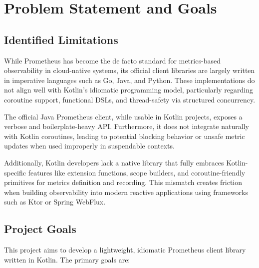 \chapter{Problem Statement and Goals} \label{ch:problemdescription}

\section{Identified Limitations}

While Prometheus has become the de facto standard for metrics-based observability in cloud-native systems, its official client libraries are largely written in imperative languages such as Go, Java, and Python. These implementations do not align well with Kotlin’s idiomatic programming model, particularly regarding coroutine support, functional DSLs, and thread-safety via structured concurrency.

The official Java Prometheus client, while usable in Kotlin projects, exposes a verbose and boilerplate-heavy API. Furthermore, it does not integrate naturally with Kotlin coroutines, leading to potential blocking behavior or unsafe metric updates when used improperly in suspendable contexts.

Additionally, Kotlin developers lack a native library that fully embraces Kotlin-specific features like extension functions, scope builders, and coroutine-friendly primitives for metrics definition and recording. This mismatch creates friction when building observability into modern reactive applications using frameworks such as Ktor or Spring WebFlux.

\section{Project Goals}

This project aims to develop a lightweight, idiomatic Prometheus client library written in Kotlin. The primary goals are:

